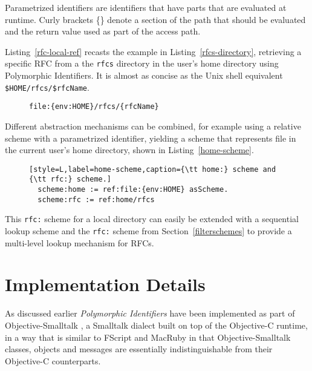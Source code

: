 \documentclass[preprint,authoryear]{llncs}
\begin{document}
Parametrized identifiers are identifiers that have parts that are evaluated
at runtime.  Curly brackets \{\} denote a section of the path that should be evaluated and
the return value used as part of the access path.

Listing~\ref{rfc-local-ref} recasts the example in Listing~\ref{rfcs-directory}, retrieving a specific RFC from a 
the {\tt rfcs} directory in the user's home directory using Polymorphic Identifiers.  It is almost
as concise as the Unix shell equivalent {\tt \$HOME/rfcs/\$rfcName}.

\begin{figure}[htbp]
\begin{lstlisting}[style=L,label=rfc-local-ref,caption=Parametrized identifier for local RFC access.]
file:{env:HOME}/rfcs/{rfcName}
\end{lstlisting}
\end{figure}


Different abstraction mechanisms can be combined, for example using a
relative scheme with a parametrized identifier, yielding
a scheme that represents file in the current user's home directory, shown
in Listing~\ref{home-scheme}.


\begin{figure}[htbp]
\begin{lstlisting}[style=L,label=home-scheme,caption={\tt home:} scheme and {\tt rfc:} scheme.]
  scheme:home := ref:file:{env:HOME} asScheme.
  scheme:rfc := ref:home/rfcs
\end{lstlisting}
\end{figure}

This {\tt rfc:} scheme for a local directory can easily be extended with a sequential lookup scheme
and the {\tt rfc:} scheme from Section~\ref{filterschemes} to provide a multi-level lookup mechanism
for RFCs.



\section{Implementation Details}
\label{implementation}

As discussed earlier \emph{Polymorphic Identifiers} have been implemented as part of Objective-Smalltalk \cite{objst},
a Smalltalk dialect built on top of the Objective-C\cite{objc-evol}\cite{objc-apple} runtime, 
in a way that is similar to FScript\cite{fscript} and MacRuby \cite{macruby} in that Objective-Smalltalk classes,
objects and messages are essentially indistinguishable from their Objective-C counterparts.
\end{document}
